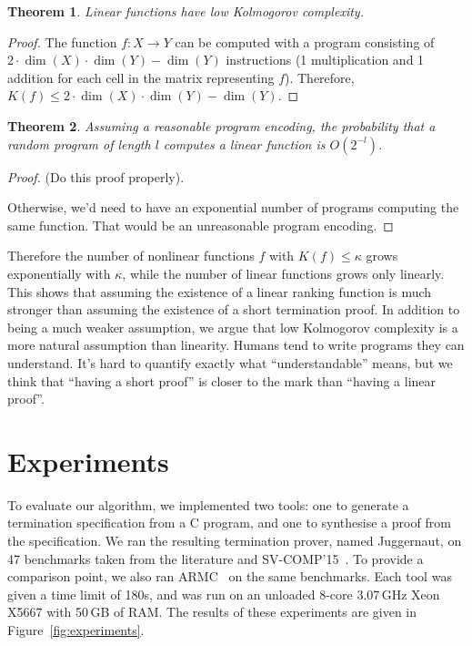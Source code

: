 \documentclass[preprint]{sigplanconf}
\newtheorem{theorem}{Theorem}
\theoremstyle{definition}
\begin{document}
\begin{theorem}
 Linear functions have low Kolmogorov complexity.
\end{theorem}

\begin{proof}
 The function $f: X \to Y$ can be computed with a program consisting of
 $2 \cdot \dim(X) \cdot \dim(Y) - \dim(Y)$ instructions (1 multiplication and 1 addition for
 each cell in the matrix representing $f$).  Therefore,
 $K(f) \leq 2 \cdot \dim(X) \cdot \dim(Y) - \dim(Y)$.
\end{proof}

\begin{theorem}
Assuming a reasonable program encoding, the probability that a random program of length $l$ computes
a linear function is $O(2^{-l})$.
\end{theorem}

\begin{proof}
 (Do this proof properly).
 
 Otherwise, we'd need to have an exponential number of programs computing the same function.
 That would be an unreasonable program encoding.
\end{proof}


Therefore the number of nonlinear functions $f$ with $K(f) \leq \kappa$
grows exponentially with $\kappa$, while the number of linear functions
grows only linearly.  This shows that assuming the existence of a linear
ranking function is much stronger than assuming the existence of a short
termination proof.  In addition to being a much weaker assumption,
we argue that low Kolmogorov complexity is a more natural assumption than
linearity.  Humans tend to write programs they can understand.  It's hard
to quantify exactly what ``understandable'' means, but we think that
``having a short proof'' is closer to the mark than ``having a linear proof''.


\section{Experiments}

To evaluate our algorithm, we implemented two tools: one to generate a
termination specification from a C program, and one to synthesise a proof
from the specification.  We ran the resulting termination prover,
named {\sc Juggernaut}, on 47
benchmarks taken from the literature and SV-COMP'15~\cite{svcomp15}.  To
provide a comparison point, we also ran {\sc ARMC}~\cite{armc-website} on
the same benchmarks.  Each tool was given a time limit of 180s, and was
run on an unloaded 8-core 3.07\,GHz Xeon X5667 with 50\,GB of RAM.  The
results of these experiments are given in Figure~\ref{fig:experiments}.
\end{document}
